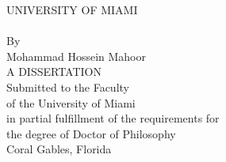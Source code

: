 \thispagestyle{empty}
\begin{center}
{\large UNIVERSITY OF MIAMI\\
\vspace{1in} {\large \mytitleA} \\\vspace{1in}
By\\
\vspace{0.5in}
Mohammad Hossein Mahoor\\
\vspace{1.5in}
A DISSERTATION\\
\vspace{0.5in}
Submitted to the Faculty\\
of the University of Miami\\
in partial fulfillment of the requirements for\\
the degree of Doctor of Philosophy\\
\vspace{1.5in}
Coral Gables, Florida\\
\vspace{0.1in} \mydate}
\end{center}
